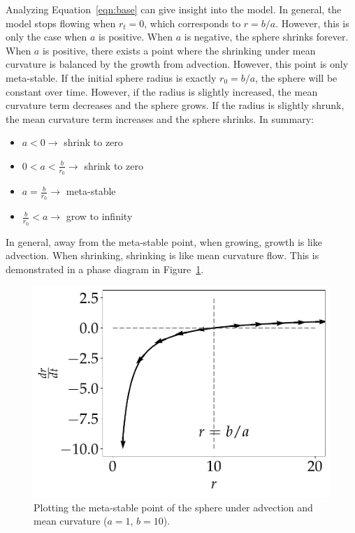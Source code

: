 \documentclass[journal]{IEEEtran}
\begin{document}
Analyzing Equation~\ref{eqn:base} can give insight into the model.
In general, the model stops flowing when $r_t = 0$, which corresponds to $r = b/a$.
However, this is only the case when $a$ is positive.
When $a$ is negative, the sphere shrinks forever.
When $a$ is positive, there exists a point where the shrinking under mean curvature is balanced by the growth from advection.
However, this point is only meta-stable.
If the initial sphere radius is exactly $r_0 = b/a$, the sphere will be constant over time.
However, if the radius is slightly increased, the mean curvature term decreases and the sphere grows.
If the radius is slightly shrunk, the mean curvature term increases and the sphere shrinks.
In summary:
\begin{itemize}
  \item $a < 0 \rightarrow$ shrink to zero
  \item $0 < a < \frac{b}{r_0} \rightarrow $ shrink to zero
  \item $ a = \frac{b}{r_0} \rightarrow $ meta-stable
  \item $\frac{b}{r_0} < a \rightarrow $ grow to infinity
\end{itemize}
In general, away from the meta-stable point, when growing, growth is like advection. When shrinking, shrinking is like mean curvature flow.
This is demonstrated in a phase diagram in Figure~\ref{fig:loss}.

\begin{figure}[b]
  \centering
    \includegraphics[width=0.9\linewidth]{loss}%
  \caption{Plotting the meta-stable point of the sphere under advection and mean curvature ($a = 1$, $b = 10$).}
  \label{fig:loss}
\end{figure}
\end{document}
